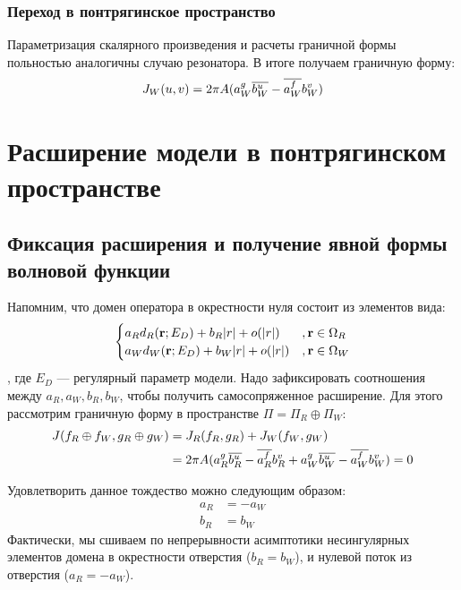 \subsubsection{Переход в понтрягинское пространство}
Параметризация скалярного произведения и расчеты граничной формы польностью аналогичны случаю резонатора. В итоге получаем граничную форму:
\begin{align*}
J_W(u, v) = 2 \pi A (a_W^g \overline{b_W^u} - \overline{a_W^f} b_W^v)
\end{align*}

\section{Расширение модели в понтрягинском пространстве}
\subsection{Фиксация расширения и получение явной формы волновой функции}

Напомним, что домен оператора в окрестности нуля состоит из элементов вида:
\[
\begin{cases}
a_R d_R(\vb{r}; E_D) + b_R |r| + o(|r|)  &, \vb{r} \in \Omega_R \\
a_W d_W(\vb{r}; E_D) + b_W |r| + o(|r|)  &, \vb{r} \in \Omega_W \\
\end{cases}
\], где $E_D$ — регулярный параметр модели. Надо зафиксировать соотношения между $a_R, a_W, b_R, b_W$, чтобы получить самосопряженное расширение. Для этого рассмотрим граничную форму в пространстве $\Pi = \Pi_R \oplus \Pi_W$:
\begin{align*}
J(f_R \oplus f_W, g_R \oplus g_W)
&= J_R(f_R, g_R) + J_W(f_W, g_W) \\
&= 2 \pi A (a_R^g \overline{b_R^u} - \overline{a_R^f} b_R^v  + a_W^g \overline{b_W^u} - \overline{a_W^f} b_W^v)  = 0
\end{align*}

Удовлетворить данное тождество можно следующим образом:
\begin{align*}
a_R &= -a_W \\
b_R &= b_W
\end{align*}
Фактически, мы сшиваем по непрерывности асимптотики несингулярных элементов домена в окрестности отверстия ($b_R = b_W$), и нулевой поток из отверстия ($a_R = -a_W$).

